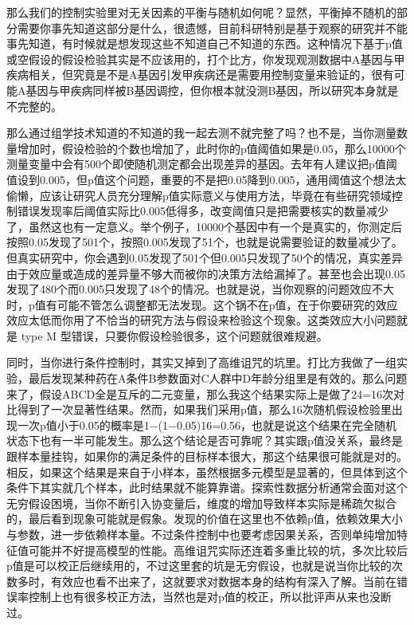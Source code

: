 \documentclass[
]{book}
\begin{document}
那么我们的控制实验里对无关因素的平衡与随机如何呢？显然，平衡掉不随机的部分需要你事先知道这部分是什么，很遗憾，目前科研特别是基于观察的研究并不能事先知道，有时候就是想发现这些不知道自己不知道的东西。这种情况下基于p值或空假设的假设检验其实是不应该用的，打个比方，你发现观测数据中A基因与甲疾病相关，但究竟是不是A基因引发甲疾病还是需要用控制变量来验证的，很有可能A基因与甲疾病同样被B基因调控，但你根本就没测B基因，所以研究本身就是不完整的。

那么通过组学技术知道的不知道的我一起去测不就完整了吗？也不是，当你测量数量增加时，假设检验的个数也增加了，此时你的p值阈值如果是0.05，那么10000个测量变量中会有500个即使随机测定都会出现差异的基因。去年有人建议把p值阈值设到0.005，但p值这个问题，重要的不是把0.05降到0.005，通用阈值这个想法太偷懒，应该让研究人员充分理解p值实际意义与使用方法，毕竟在有些研究领域控制错误发现率后阈值实际比0.005低得多，改变阈值只是把需要核实的数量减少了，虽然这也有一定意义。举个例子，10000个基因中有一个是真实的，你测定后按照0.05发现了501个，按照0.005发现了51个，也就是说需要验证的数量减少了。但真实研究中，你会遇到0.05发现了501个但0.005只发现了50个的情况，真实差异由于效应量或造成的差异量不够大而被你的决策方法给漏掉了。甚至也会出现0.05发现了480个而0.005只发现了48个的情况。也就是说，当你观察的问题效应不大时，p值有可能不管怎么调整都无法发现。这个锅不在p值，在于你要研究的效应效应太低而你用了不恰当的研究方法与假设来检验这个现象。这类效应大小问题就是 type M 型错误，只要你假设检验很多，这个问题就很难规避。

同时，当你进行条件控制时，其实又掉到了高维诅咒的坑里。打比方我做了一组实验，最后发现某种药在A条件B参数面对C人群中D年龄分组里是有效的。那么问题来了，假设ABCD全是互斥的二元变量，那么我这个结果实际上是做了24=16次对比得到了一次显著性结果。然而，如果我们采用p值，那么16次随机假设检验里出现一次p值小于0.05的概率是1−(1−0.05)16=0.56，也就是说这个结果在完全随机状态下也有一半可能发生。那么这个结论是否可靠呢？其实跟p值没关系，最终是跟样本量挂钩，如果你的满足条件的目标样本很大，那这个结果很可能就是对的。相反，如果这个结果是来自于小样本，虽然根据多元模型是显著的，但具体到这个条件下其实就几个样本，此时结果就不能算靠谱。探索性数据分析通常会面对这个无穷假设困境，当你不断引入协变量后，维度的增加导致样本实际是稀疏欠拟合的，最后看到现象可能就是假象。发现的价值在这里也不依赖p值，依赖效果大小与参数，进一步依赖样本量。不过条件控制中也要考虑因果关系，否则单纯增加特征值可能并不好提高模型的性能。高维诅咒实际还连着多重比较的坑，多次比较后p值是可以校正后继续用的，不过这里套的坑是无穷假设，也就是说当你比较的次数多时，有效应也看不出来了，这就要求对数据本身的结构有深入了解。当前在错误率控制上也有很多校正方法，当然也是对p值的校正，所以批评声从来也没断过。
\end{document}
